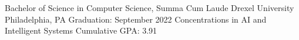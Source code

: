 

\begin{cventries}

  \cventry
    {Bachelor of Science in Computer Science, Summa Cum Laude} %
    {Drexel University} %
    {Philadelphia, PA} %
    {Graduation: September 2022} %
    {}
  \vspace*{-.4cm}\cventry
    {Concentrations in AI and Intelligent Systems}
    {}
    {}
    {Cumulative GPA: 3.91}
    {}

\end{cventries}
